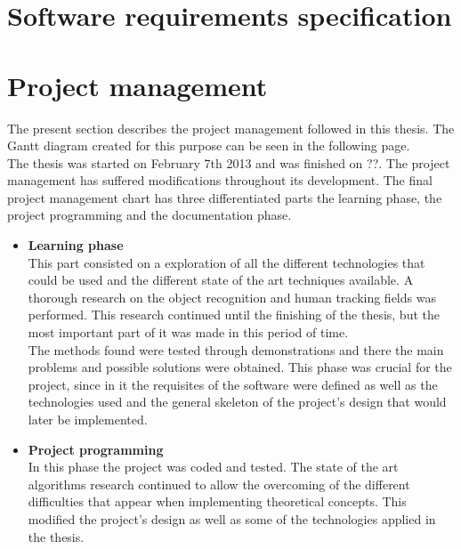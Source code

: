 \begin{appendices}
	\chapter{Software requirements specification}
			


	\chapter{Project management}
		 The present section describes the project management followed in this thesis. The Gantt diagram created for this purpose can be seen in the following page.
		 \\

		 The thesis was started on February 7th 2013 and was finished on ??.  
		 The project management has suffered modifications throughout its development.  The final project management chart has three differentiated parts the learning phase, the project programming and the documentation phase. 
		 \begin{itemize}
			 	\item{\textbf{Learning phase}} \\
			 	This part consisted on a exploration of all the different technologies that could be used and the different state of the art techniques available. A thorough research on the object recognition and human tracking fields was performed. This research continued until the finishing of the thesis, but the most important part of it was made in this period of time. 
			 	\\

			 	The methods found were tested through demonstrations and there the main problems and possible solutions were obtained. This phase was crucial for the project, since in it the requisites of the software were defined as well as the technologies used and the general skeleton of the project's design that would later be implemented. 
			 	\\

			 	\item{\textbf{Project programming}}\\
			 	In this phase the project was coded and tested. The state of the art algorithms research continued to allow the overcoming of the different difficulties that appear when implementing theoretical concepts. This modified the project's design as well as some of the technologies applied in the thesis. 


\end{itemize}
\end{appendices}
